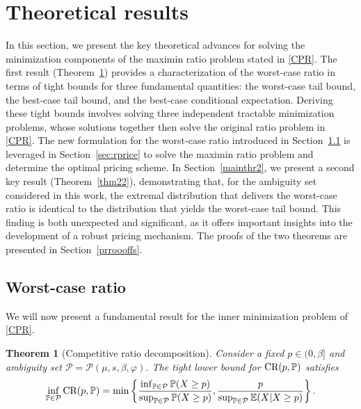\documentclass[11pt]{article}
\newtheorem{theorem}{Theorem}[section]
\newcommand{\bP}{\mathbb{P}}
\newcommand{\cP}{\mathcal{P}}
\newcommand{\bE}{\mathbb{E}}
\newcommand{\1}{\mathds{1}}
\begin{document}
\section{Theoretical results}\label{sec:fun}
In this section, we present the key theoretical advances for solving the minimization components of the maximin ratio problem stated in \eqref{CPR}. The first result (Theorem~\ref{CRDT}) provides a characterization of the worst-case ratio in terms of tight bounds for three fundamental quantities: the worst-case tail bound, the best-case tail bound, and the best-case conditional expectation. Deriving these tight bounds involves solving three independent tractable minimization problems, whose solutions together then solve the original ratio problem in  \eqref{CPR}. 
The new formulation for the worst-case ratio introduced in Section~\ref{mainthr1} is leveraged in Section~\ref{sec:rprice} to solve the maximin ratio problem and determine the optimal pricing scheme. In Section~\ref{mainthr2}, we present a second key result (Theorem~\ref{thm22}), demonstrating that, for the ambiguity set considered in this work, the extremal distribution that delivers the worst-case ratio is identical to the distribution that yields the worst-case tail bound. This finding is both unexpected and significant, as it offers important insights into the development of a robust pricing mechanism. The proofs of the two theorems are presented in Section~\ref{prroooffs}.

\subsection{Worst-case ratio}\label{mainthr1}
We will now present a fundamental result for the inner minimization problem of \eqref{CPR}. 
\begin{theorem}[Competitive ratio decomposition]\label{CRDT}
Consider a fixed $p\in(0,\beta]$ and ambiguity set $\cP = \cP(\mu,s,\beta,\varphi)$.
The tight lower bound for $\textup{CR}(p,\bP)$ satisfies
\begin{align}\label{decomposition}
    \inf_{\bP\in \cP} \textup{CR}(p,\bP) = \min\left\{\frac{\inf_{\bP\in \cP}\bP(X\geq p)}{\sup_{\bP\in \cP}\bP(X\geq p)}, \frac{p}{\sup_{\bP\in \cP}\bE(X|X \geq p)}\right\}.
\end{align}
\end{theorem}
\end{document}
